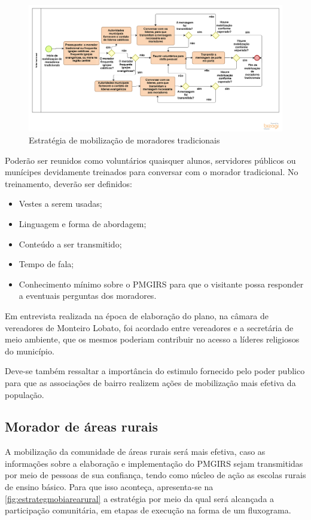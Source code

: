 \begin{figure}[h!]
	\centering
	\includegraphics[width=\linewidth]{produtos/produm/estrategmobi}
	\caption{Estratégia de mobilização de moradores tradicionais}
	\label{fig:estrategmobi}
\end{figure}

Poderão ser reunidos como voluntários quaisquer alunos, servidores públicos ou munícipes devidamente treinados para conversar com o morador tradicional. No treinamento, deverão ser definidos:

\begin{itemize}
	\item Vestes a serem usadas;
	\item Linguagem e forma de abordagem;
	\item Conteúdo a ser transmitido;
	\item Tempo de fala;
	\item Conhecimento mínimo sobre o PMGIRS para que o visitante possa responder a eventuais
	perguntas dos moradores.
\end{itemize}

Em entrevista realizada na época de elaboração do plano, na câmara de vereadores de Monteiro Lobato, foi acordado entre vereadores e a secretária de meio ambiente, que os mesmos poderiam contribuir no acesso a líderes religiosos do município.

Deve-se também ressaltar a importância do estimulo fornecido pelo poder publico para que as associações de bairro realizem ações de mobilização mais efetiva da população.

\subsection{Morador de áreas rurais}

A mobilização da comunidade de áreas rurais será mais efetiva, caso as informações sobre a elaboração e implementação do PMGIRS sejam transmitidas por meio de pessoas de sua confiança, tendo como núcleo de ação as escolas rurais de ensino básico. Para que isso aconteça, apresenta-se na \autoref{fig:estrategmobiarearural} a estratégia por meio da qual será alcançada a participação comunitária, em etapas de execução na forma de um fluxograma.

